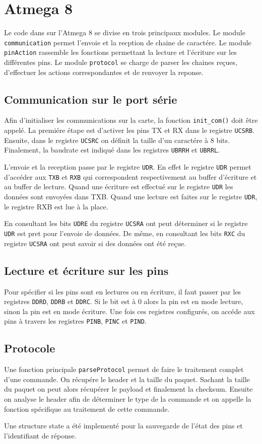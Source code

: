\section{Atmega 8}
Le code dans sur l'Atmega 8 se divise en trois principaux modules.
Le module \texttt{communication} permet l'envoie et la recption de chaine de caractére.
Le module \texttt{pinAction} rassemble les fonctions permettant la lecture et l'écriture sur les différentes pins.
Le module \texttt{protocol} se charge de parser les chaines reçues, d'effectuer les actions correspondantes et de renvoyer la reponse.

\subsection{Communication sur le port série}
Afin d'initialiser les communications sur la carte, la fonction \texttt{init\_com()} doit être appelé.
La premiére étape est d'activer les pins TX et RX dans le registre \texttt{UCSRB}.
Ensuite, dans le registre \texttt{UCSRC} on définit la taille d'un caractére à 8 bits.
Finalement, la baudrate est indiqué dans les registres \texttt{UBRRH} et \texttt{UBRRL}.

L'envoie et la reception passe par le registre \texttt{UDR}.
En effet le registre \texttt{UDR} permet d'accéder aux \texttt{TXB} et \texttt{RXB} qui correspondent respectivement au buffer d'écriture et au buffer de lecture.
Quand une écriture est effectué sur le registre \texttt{UDR} les données sont envoyées dans TXB.
Quand une lecture est faites sur le registre \texttt{UDR}, le registre RXB est lue à la place.

En consultant les bits \texttt{UDRE} du registre \texttt{UCSRA} ont peut déterminer si le registre \texttt{UDR} est pret pour l'envoie de données.
De même, en consultant les bits \texttt{RXC} du registre \texttt{UCSRA} ont peut savoir si des données ont été reçue.

\subsection{Lecture et écriture sur les pins}
Pour spécifier si les pins sont en lectures ou en écriture, il faut passer par les registres \texttt{DDRD}, \texttt{DDRB} et \texttt{DDRC}.
Si le bit est à 0 alors la pin est en mode lecture, sinon la pin est en mode écriture.
Une fois ces registres configurés, on accéde aux pins à travers les registres \texttt{PINB}, \texttt{PINC} et \texttt{PIND}.


\subsection{Protocole}
Une fonction principale \texttt{parseProtocol} permet de faire le traitement complet d'une commande.
On récupére le header et la taille du paquet.
Sachant la taille du paquet on peut alors récupérer le payload et finalement la checksum.
Ensuite on analyse le header afin de déterminer le type de la commande et on appelle la fonction spécifique au traitement de cette commande.

Une structure state a été implementé pour la sauvegarde de l'état des pins et l'identifiant de réponse.

